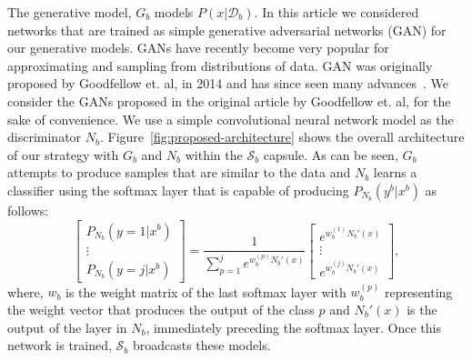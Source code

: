 \documentclass[10pt,twocolumn,letterpaper]{article}
\def \cS{{\mathcal{S}}}
\def \cD{{\mathcal{D}}}
\begin{document}
	The generative model, $G_b$ models $P(x | \cD_b)$. 
	In this article we considered networks that are trained as simple generative adversarial networks (GAN) for our generative models. 
	GANs have recently become very popular for approximating and sampling from distributions of data. 
	GAN was originally proposed by Goodfellow et. al, in 2014 and has since seen many advances~\cite{goodfellow2014generative}.  
	We consider the GANs proposed in the original article by Goodfellow et. al, for the sake of convenience.
	We use a simple convolutional neural network model as the discriminator $N_b$.  
	Figure~\ref{fig:proposed-architecture} shows the overall architecture of our strategy with $G_b$ and $N_b$ within the $\cS_b$ capsule. 
	As can be seen, $G_b$ attempts to produce samples that are similar to the data and $N_b$ learns a classifier using the softmax layer that is capable of producing $P_{N_b}(y^b \vert x^b)$ as follows:
	\begin{equation}
	\label{eqn:softmax}
	\begin{bmatrix}
	P_{N_b} (y = 1 \vert x^b ) \\
	\vdots \\
	P_{N_b} (y = j \vert x^b ) 
	\end{bmatrix}
	=
	\frac{1}{\sum_{p=1}^j e^{w_b^{(p)}N_b'(x)}}
	\begin{bmatrix}
	e^{w_b^{(1)}N_b'(x)} \\
	\vdots \\
	e^{w_b^{(j)}N_b'(x)} 
	\end{bmatrix},
	\end{equation} 
	where, $w_b$ is the weight matrix of the last softmax layer with $w_b^{(p)}$ representing the weight vector that produces the output of the class $p$ and $N_b'(x)$ is the output of the layer in $N_b$, immediately preceding the softmax layer. 
	Once this network is trained, $\cS_b$ broadcasts these models.
	
\end{document}
